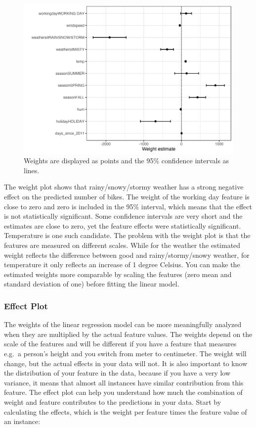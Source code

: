 \documentclass[
  12pt,
]{krantz}
\begin{document}
\begin{figure}

{\centering \includegraphics[width=\textwidth]{images/linear-weights-plot-1} 

}

\caption{Weights are displayed as points and the 95\% confidence intervals as lines.}\label{fig:linear-weights-plot}
\end{figure}

The weight plot shows that rainy/snowy/stormy weather has a strong negative effect on the predicted number of bikes.
The weight of the working day feature is close to zero and zero is included in the 95\% interval, which means that the effect is not statistically significant.
Some confidence intervals are very short and the estimates are close to zero, yet the feature effects were statistically significant.
Temperature is one such candidate.
The problem with the weight plot is that the features are measured on different scales.
While for the weather the estimated weight reflects the difference between good and rainy/stormy/snowy weather, for temperature it only reflects an increase of 1 degree Celsius.
You can make the estimated weights more comparable by scaling the features (zero mean and standard deviation of one) before fitting the linear model.

\hypertarget{effect-plot}{%
\subsubsection{Effect Plot}\label{effect-plot}}

The weights of the linear regression model can be more meaningfully analyzed when they are multiplied by the actual feature values.
The weights depend on the scale of the features and will be different if you have a feature that measures e.g.~a person's height and you switch from meter to centimeter.
The weight will change, but the actual effects in your data will not.
It is also important to know the distribution of your feature in the data, because if you have a very low variance, it means that almost all instances have similar contribution from this feature.
The effect plot can help you understand how much the combination of weight and feature contributes to the predictions in your data.
Start by calculating the effects, which is the weight per feature times the feature value of an instance:
\end{document}
